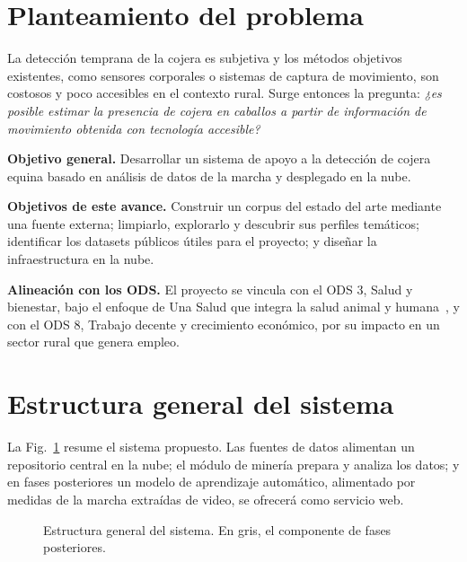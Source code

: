 \documentclass[conference,a4paper]{IEEEtran}
\begin{document}
\section{Planteamiento del problema}
La detección temprana de la cojera es subjetiva y los métodos objetivos existentes, como sensores corporales o sistemas de captura de movimiento, son costosos y poco accesibles en el contexto rural. Surge entonces la pregunta: \emph{¿es posible estimar la presencia de cojera en caballos a partir de información de movimiento obtenida con tecnología accesible?}

\textbf{Objetivo general.} Desarrollar un sistema de apoyo a la detección de cojera equina basado en análisis de datos de la marcha y desplegado en la nube.

\textbf{Objetivos de este avance.} Construir un corpus del estado del arte mediante una fuente externa; limpiarlo, explorarlo y descubrir sus perfiles temáticos; identificar los datasets públicos útiles para el proyecto; y diseñar la infraestructura en la nube.

\textbf{Alineación con los ODS.} El proyecto se vincula con el ODS 3, Salud y bienestar, bajo el enfoque de Una Salud que integra la salud animal y humana~\cite{un2015}, y con el ODS 8, Trabajo decente y crecimiento económico, por su impacto en un sector rural que genera empleo.

\section{Estructura general del sistema}
La Fig.~\ref{fig:sistema} resume el sistema propuesto. Las fuentes de datos alimentan un repositorio central en la nube; el módulo de minería prepara y analiza los datos; y en fases posteriores un modelo de aprendizaje automático, alimentado por medidas de la marcha extraídas de video, se ofrecerá como servicio web.

\begin{figure}[t]
\centering
{}
\caption{Estructura general del sistema. En gris, el componente de fases posteriores.}
\label{fig:sistema}
\end{figure}
\end{document}
